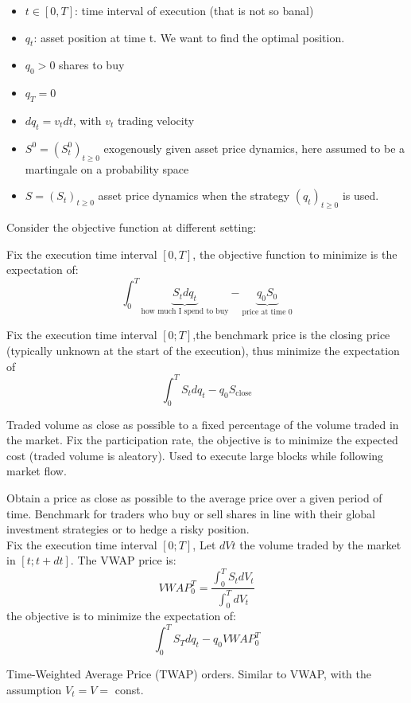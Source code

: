 \begin{mysetting}
	\begin{itemize}
		\item $t \in [0,T]$: time interval of execution (that is not so banal)
		\item $q_t$: asset position at time t. We want to find the optimal position.
		\item $q_0 >0$ shares to buy
		\item $q_T = 0$
		\item $dq_t = v_tdt$, with $v_t$ trading velocity
		\item $S^0 = (S^0_t)_{t\geq 0}$ exogenously given asset price dynamics, here assumed to be a martingale on a probability space
		\item $S = (S_t)_{t\geq 0}$ asset price dynamics when the strategy $(q_t)_{t\geq 0}$ is used.
	\end{itemize}
\end{mysetting}
Consider the objective function at different setting:
\begin{mysetting}
	Fix the execution time interval $[0,T]$, the objective function to minimize is the expectation of:
	\[
	\int_{0}^{T} \underbrace{S_tdq_t}_{\text{how much I spend to buy}} - \underbrace{q_0S_0}_{\text{price at time 0}}
	\]
\end{mysetting}
\begin{mysetting}
	Fix the execution time interval $[0;T]$,the benchmark price is the closing price (typically unknown at the start of the execution), thus minimize the expectation of
	\[
	\int_{0}^{T} S_tdq_t- q_0S_{\text{close}}
	\]
\end{mysetting}
\newpage
\begin{mysetting}
	Traded volume as close as possible to a fixed percentage of the volume traded in the market. Fix the participation rate, the objective is to minimize the expected cost (traded volume is aleatory). Used to execute large blocks while following market flow.
\end{mysetting}
\begin{mysetting}
	Obtain a price as close as possible to the average price over a given period of time. Benchmark for traders who buy or sell shares in line with their global investment strategies or to hedge a risky position.\\
	Fix the execution time interval $[0;T]$, Let $dVt$ the volume traded by the market in $[t; t + dt]$. The VWAP price is:
	\[
	VWAP_0^T = \frac{\int_0^T S_tdV_t}{\int_{0}^{T} dV_t}
	\]
	the objective is to minimize the expectation of:
	\[
	\int_{0}^{T} S_T dq_t - q_0VWAP_0^T
	\]
\end{mysetting}
Time-Weighted Average Price (TWAP) orders. Similar to VWAP, with the assumption $V_t = V =$ const.
